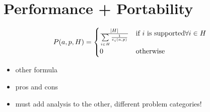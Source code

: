 \section{Performance + Portability}

\[ P(a, p, H) = \begin{cases}
    \frac{\lvert H\rvert}{\sum\limits_{i \in H} \frac{1}{e_i(a, p)}} & \text{if }i\text{ is supported} \forall i \in H \\
    0 & \text{otherwise}
\end{cases} \]
\begin{itemize}
    \item other formula
    \item pros and cons
    \item must add analysis to the other, different problem categories!
\end{itemize}
